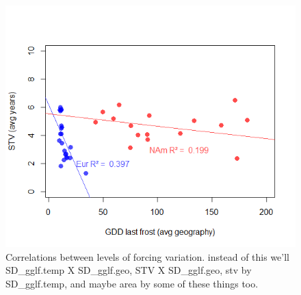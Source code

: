 \documentclass[11pt]{article}\usepackage[]{graphicx}\usepackage[]{color}
\begin{document}
\begin{figure}[h!]
    \centering
 \includegraphics[width=\textwidth]{..//figures/STVvsGDDNamEu.png} 
    \caption{Correlations between levels of forcing variation. instead of this we'll SD_gglf.temp X SD_gglf.geo, STV X SD_gglf.geo, stv by SD_gglf.temp, and maybe area by some of these things too.}
    \label{fig:climcor}
\end{figure}
\end{document}
